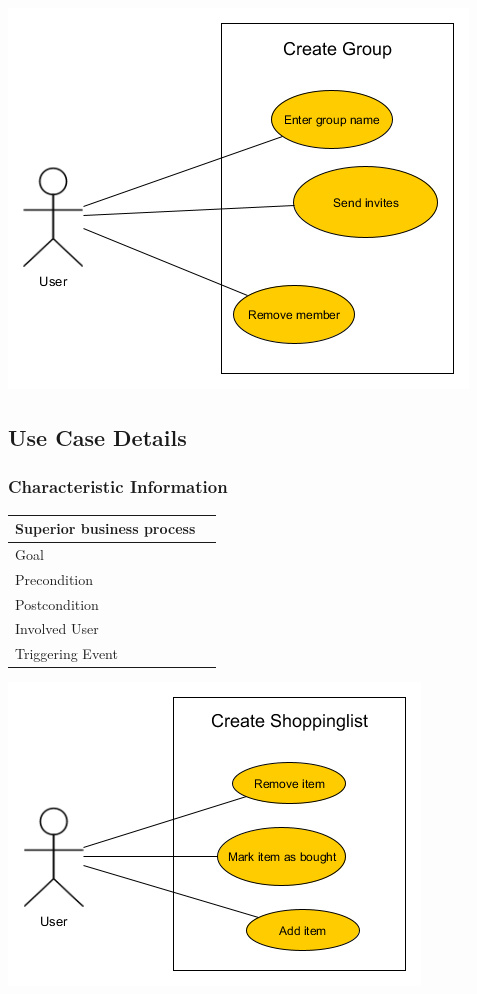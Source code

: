 \documentclass[12pt]{article}
\theoremstyle{definition}
\begin{document}
\includegraphics[scale=.5]{UseCaseCreateGroup.png}\\

\subsection{Use Case Details}

\subsubsection{Characteristic Information}

\begin{tabular}{|l|l|}
\hline
Superior business process &  \\ \hline
Goal &  \\ \hline
Precondition &  \\ \hline
Postcondition &  \\ \hline
Involved User &  \\ \hline
Triggering Event &  \\ \hline
\end{tabular}

\includegraphics[scale=.5]{UseCaseCreateShoppinglist.png}\\
\end{document}
